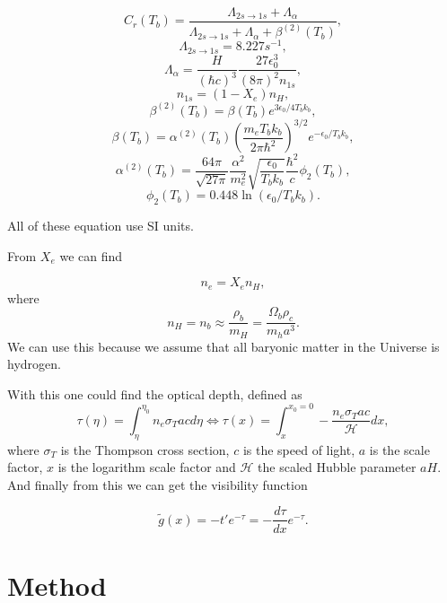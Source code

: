 \documentclass[a4paper,norsk, 10pt]{article}
\begin{document}
\begin{equation}
C_r (T_b) = \frac{\Lambda_{2s \rightarrow 1s}+ \Lambda_{\alpha}}{\Lambda_{2s \rightarrow 1s} + \Lambda_{\alpha} + \beta^{(2)}(T_b)},
\end{equation}
\begin{equation}
\Lambda_{2s\rightarrow 1s} = 8.227 s^{-1},
\end{equation}
\begin{equation}
\Lambda_{\alpha} = \frac{H}{(\hbar c)^3}\frac{27\epsilon_0^3}{(8\pi)^2 n_{1s}},
\end{equation}
\begin{equation}
n_{1s} = (1-X_e)n_{H},
\end{equation}
\begin{equation}
\beta^{(2)}(T_b) = \beta(T_b)e^{3\epsilon_0/4T_bk_b},
\end{equation}
\begin{equation}
\beta(T_b) = \alpha^{(2)}(T_b)\left(\frac{m_eT_b k_b}{2\pi \hbar^2}\right)^{3/2}e^{-\epsilon_0/T_bk_b},
\end{equation}
\begin{equation}
\alpha^{(2)}(T_b) = \frac{64\pi}{\sqrt{27\pi}}\frac{\alpha^2}{m_e^2}\sqrt{\frac{\epsilon_0}{T_bk_b}}\frac{\hbar^2}{c}\phi_{2}(T_b),
\end{equation}
\begin{equation}
\phi_{2}(T_b) = 0.448\ln(\epsilon_0/T_bk_b).
\end{equation}

All of these equation use SI units. 

From $X_e$ we can find

\begin{equation}
n_e = X_e n_H,
\end{equation}
where
\begin{equation}
n_H = n_b \approx \frac{\rho_b}{m_H} = \frac{\Omega_b \rho_c}{m_h a^3}.
\end{equation}
We can use this because we assume that all baryonic matter in the Universe is hydrogen.

With this one could find the optical depth, defined as 
\begin{equation}
\tau(\eta) = \int_{\eta}^{\eta_0} n_e \sigma_T a c d\eta \Leftrightarrow \tau(x) = \int_x^{x_0 = 0} - \frac{n_e \sigma_T a c}{\mathcal{H}} dx,
\end{equation}
where $\sigma_T$ is the Thompson cross section, $c$ is the speed of light, $a$ is the scale factor, $x$ is the logarithm scale factor and $\mathcal{H}$ the scaled Hubble parameter $aH$. And finally from this we can get the visibility function

\begin{equation}
\tilde{g} (x) = -t'e^{-\tau} = -\frac{d\tau}{dx}e^{-\tau}.
\end{equation}


\section{Method}
\end{document}

